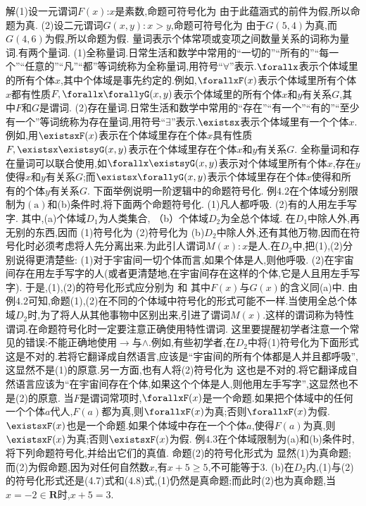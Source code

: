 {解(1)设一元谓词$F(x)$:$x$是素数,命题可符号化为
由于此蕴涵式的前件为假,所以命题为真.
(2)设二元谓词$G(x,y):x>y$,命题可符号化为
由于$G(5,4)$为真,而$G(4,6)$为假,所以命题为假.
量词表示个体常项或变项之间数量关系的词称为量词.有两个量词.
(1)全称量词.日常生活和数学中常用的“一切的”“所有的”“每一个”“任意的”“凡”“都”等词统称为全称量词,用符号“$\forall”$表示.$\forallx$表示个体域里的所有个体$x$,其中个体域是事先约定的.例如,$\forallxF(x)$表示个体域里所有个体$x$都有性质$F,\forallx\forallyG(x,y)$表示个体域里的所有个体$x$和$y$有关系$G$,其中$F$和$G$是谓词.
(2)存在量词.日常生活和数学中常用的“存在”“有一个”“有的”“至少有一个”等词统称为存在量词,用符号“$\exists$”表示.$\existsx$表示个体域里有一个个体$x$.例如,用$\existsxF(x)$表示在个体域里存在个体$x$具有性质$F,\existsx\existsyG(x,y)$表示在个体域里存在个体$x$和$y$有关系$G$.
全称量词和存在量词可以联合使用,如$\forallx\existsyG(x,y)$表示对个体域里所有个体$x$,存在$y$使得$x$和$y$有关系$G$;而$\existsx\forallyG(x,y)$表示个体域里存在个体$x$使得和所有的个体$y$有关系$G$.
下面举例说明一阶逻辑中的命题符号化.
例$4.2$在个体域分别限制为$(\mathrm{a})$和(b)条件时,将下面两个命题符号化.
(1)凡人都呼吸.
(2)有的人用左手写字.
其中,(a)个体域$D_{1}$为人类集合,
（b）个体域$D_{2}$为全总个体域.
在$D_{1}$中除人外,再无别的东西,因而
(1)符号化为
(2)符号化为
(b)$D_{2}$中除人外,还有其他万物,因而在符号化时必须考虑将人先分离出来.为此引人谓词$M(x):x$是人.在$D_{2}$中,把(1),(2)分别说得更清楚些:
(1)对于宇宙间一切个体而言,如果个体是人,则他呼吸.
(2)在宇宙间存在用左手写字的人(或者更清楚地,在宇宙间存在这样的个体,它是人且用左手写字).
于是,(1),(2)的符号化形式应分别为
和
其中$F(x)$与$G(x)$的含义同(a)中.
由例$4.2$可知,命题(1),(2)在不同的个体域中符号化的形式可能不一样.当使用全总个体域$D_{2}$时,为了将人从其他事物中区别出来,引进了谓词$M(x)$.这样的谓词称为特性谓词.在命题符号化时一定要注意正确使用特性谓词.
这里要提醒初学者注意一个常见的错误:不能正确地使用$\rightarrow$与$\wedge$.例如,有些初学者,在$D_{2}$中将(1)符号化为下面形式
这是不对的.若将它翻译成自然语言,应该是“宇宙间的所有个体都是人并且都呼吸”,这显然不是(1)的原意.另一方面,也有人将(2)符号化为
这也是不对的.将它翻译成自然语言应该为“在宇宙间存在个体,如果这个个体是人,则他用左手写字”,这显然也不是(2)的原意.
当$F$是谓词常项时,$\forallxF(x)$是一个命题.如果把个体域中的任何一个个体$a$代人,$F(a)$都为真,则$\forallxF(x)$为真;否则$\forallxF(x)$为假.$\existsxF(x)$也是一个命题.如果个体域中存在一个个体$a$,使得$F(a)$为真,则$\existsxF(x)$为真;否则$\existsxF(x)$为假.
例$4.3$在个体域限制为(a)和(b)条件时,将下列命题符号化,并给出它们的真值.
命题(2)的符号化形式为
显然(1)为真命题;而(2)为假命题,因为对任何自然数$x$,有$x+5\geqslant5$,不可能等于3.
(b)在$D_{2}$内,(1)与(2)的符号化形式还是(4.7)式和(4.8)式,(1)仍然是真命题;而此时(2)也为真命题,当$x=-2\in\mathbf{R}$时,$x+5=3$.
}
